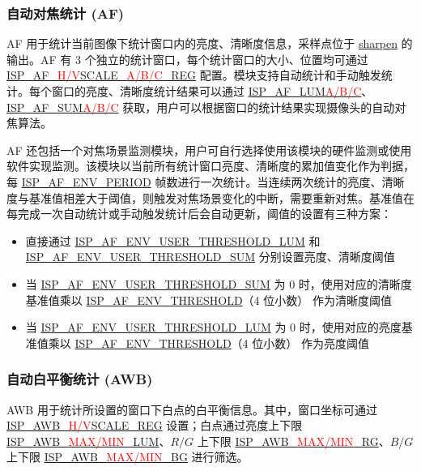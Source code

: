 \documentclass[main\_\_CN.tex]{subfiles}
\begin{document}
\subsubsection{自动对焦统计 (AF)}

AF 用于统计当前图像下统计窗口内的亮度、清晰度信息，采样点位于 \hyperref[sec:isp_sharpen]{sharpen} 的输出。AF 有 3 个独立的统计窗口，每个统计窗口的大小、位置均可通过 \hyperref[regdesc:ISPAFHSCALEAREG]{ISP\_AF\_\textcolor{red}{H/V}SCALE\_\textcolor{red}{A/B/C}\_REG} 配置。模块支持自动统计和手动触发统计。每个窗口的亮度、清晰度统计结果可以通过 \hyperref[fielddesc:ISPAFLUMA]{ISP\_AF\_LUM\textcolor{red}{A/B/C}}、\hyperref[fielddesc:ISPAFSUMA]{ISP\_AF\_SUM\textcolor{red}{A/B/C}} 获取，用户可以根据窗口的统计结果实现摄像头的自动对焦算法。

AF 还包括一个对焦场景监测模块，用户可自行选择使用该模块的硬件监测或使用软件实现监测。该模块以当前所有统计窗口亮度、清晰度的累加值变化作为判据，每 \hyperref[fielddesc:ISPAFENVPERIOD]{ISP\_AF\_ENV\_PERIOD} 帧数进行一次统计。当连续两次统计的亮度、清晰度与基准值相差大于阈值，则触发对焦场景变化的中断，需要重新对焦。基准值在每完成一次自动统计或手动触发统计后会自动更新，阈值的设置有三种方案：
\begin{itemize}
    \item 直接通过 \hyperref[fielddesc:ISPAFENVUSERTHRESHOLDLUM]{ISP\_AF\_ENV\_USER\_THRESHOLD\_LUM} 和 \hyperref[fielddesc:ISPAFENVUSERTHRESHOLDSUM]{ISP\_AF\_ENV\_USER\_THRESHOLD\_SUM} 分别设置亮度、清晰度阈值
    \item 当 \hyperref[fielddesc:ISPAFENVUSERTHRESHOLDSUM]{ISP\_AF\_ENV\_USER\_THRESHOLD\_SUM} 为 0 时，使用对应的清晰度基准值乘以 \hyperref[fielddesc:ISPAFENVTHRESHOLD]{ISP\_AF\_ENV\_THRESHOLD}（4 位小数） 作为清晰度阈值
    \item 当 \hyperref[fielddesc:ISPAFENVUSERTHRESHOLDLUM]{ISP\_AF\_ENV\_USER\_THRESHOLD\_LUM} 为 0 时，使用对应的亮度基准值乘以 \hyperref[fielddesc:ISPAFENVTHRESHOLD]{ISP\_AF\_ENV\_THRESHOLD}（4 位小数） 作为亮度阈值
\end{itemize}


\subsubsection{自动白平衡统计 (AWB)}

AWB 用于统计所设置的窗口下白点的白平衡信息。其中，窗口坐标可通过 \hyperref[regdesc:ISPAWBHSCALEREG]{ISP\_AWB\_\textcolor{red}{H/V}SCALE\_REG} 设置；白点通过亮度上下限 \hyperref[fielddesc:ISPAWBMAXLUM]{ISP\_AWB\_\textcolor{red}{MAX/MIN}\_LUM}、$R/G$ 上下限 \hyperref[fielddesc:ISPAWBMAXRG]{ISP\_AWB\_\textcolor{red}{MAX/MIN}\_RG}、$B/G$ 上下限 \hyperref[fielddesc:ISPAWBMAXBG]{ISP\_AWB\_\textcolor{red}{MAX/MIN}\_BG} 进行筛选。
\end{document}
